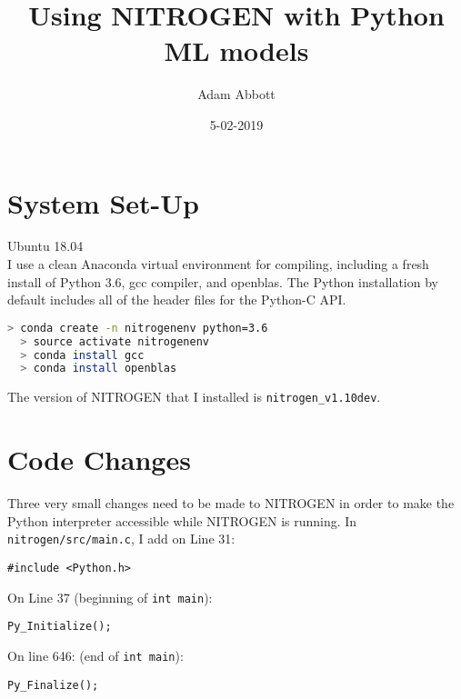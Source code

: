 \documentclass{article}
\title{Using NITROGEN with Python ML models}
\date{5-02-2019}
\author{Adam Abbott}
\begin{document}
\maketitle
\section{System Set-Up}
Ubuntu 18.04\\
I use a clean Anaconda virtual environment for compiling, including a fresh install of Python 3.6, gcc compiler, and openblas.
The Python installation by default includes all of the header files for the Python-C API.
\begin{lstlisting}[language=bash]
  > conda create -n nitrogenenv python=3.6 
  > source activate nitrogenenv 
  > conda install gcc
  > conda install openblas 
\end{lstlisting}

\noindent The version of NITROGEN that I installed is \texttt{nitrogen\_v1.10dev}.\\

\section{Code Changes}
\noindent Three very small changes need to be made to NITROGEN in order to make the Python interpreter accessible while NITROGEN is running.
In \texttt{nitrogen/src/main.c}, I add on Line 31:
\begin{lstlisting}[style=CStyle]
#include <Python.h>
\end{lstlisting}
On Line 37 (beginning of \lstinline[style=CStyle]{int main}):
\begin{lstlisting}[style=CStyle]
Py_Initialize();
\end{lstlisting}
On line 646: (end of \lstinline[style=CStyle]{int main}):
\begin{lstlisting}[style=CStyle]
Py_Finalize();
\end{lstlisting}
\end{document}
